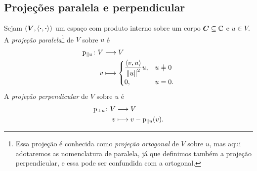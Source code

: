 \subsection{Projeções paralela e perpendicular}

\begin{definition}
Sejam $(\bm V,\left\langle{\bm{\cdot}},{\bm{\cdot}}\right\rangle)$ um espaço com produto interno sobre um corpo $\bm C \subseteq \mathbb{C}$ e $u \in V$. A \emph{projeção paralela}\footnote{Essa projeção é conhecida como \emph{projeção ortogonal} de $V$ sobre $u$, mas aqui adotaremos as nomenclatura de paralela, já que definimos também a projeção perpendicular, e essa pode ser confundida com a ortogonal.} de $V$ sobre $u$ é
	\begin{align*}
	\func{\proj_{\parallel u}}{V}{V}{v}{
		\begin{cases}
			\displaystyle\frac{\inte{v}{u}}{\nor{u}^2}u,& u \neq 0 \\
			0,& u=0.
		\end{cases}
	}
	\end{align*}
A \emph{projeção perpendicular} de $V$ sobre $u$ é
	\begin{align*}
	{\mathrm{p}_{\perp u}}\colon {V} &\longrightarrow {V} \\{v} &\longmapsto v - \mathrm{p}_{\parallel u}(v).
	\end{align*}
\end{definition}


